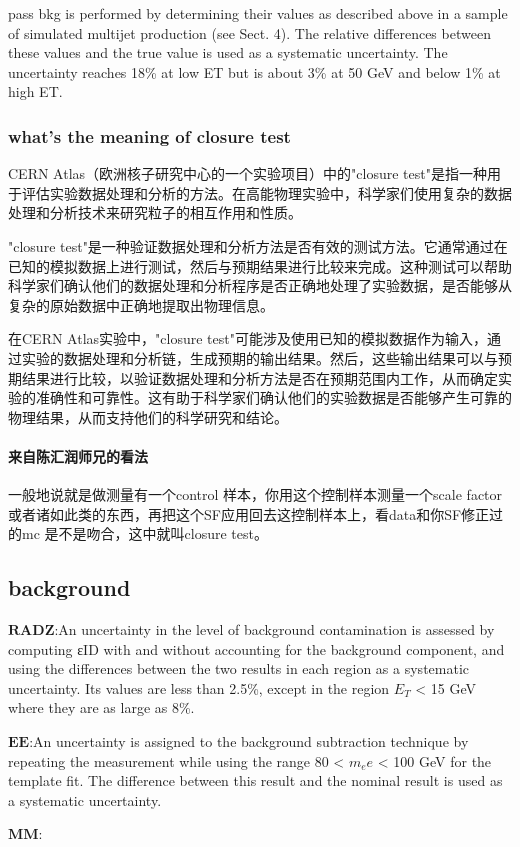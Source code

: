 \documentclass{ctexart}
\begin{document}
pass
bkg is performed by determining
their values as described above in a sample of simulated
multijet production (see Sect. 4). The relative differences
between these values and the true value is used as a systematic
uncertainty. The uncertainty reaches 18\% at low
ET but is about 3\% at 50 GeV and below 1\% at high ET.
\subsubsection{what's the meaning of closure test}
CERN Atlas（欧洲核子研究中心的一个实验项目）中的"closure test"是指一种用于评估实验数据处理和分析的方法。在高能物理实验中，科学家们使用复杂的数据处理和分析技术来研究粒子的相互作用和性质。

"closure test"是一种验证数据处理和分析方法是否有效的测试方法。它通常通过在已知的模拟数据上进行测试，然后与预期结果进行比较来完成。这种测试可以帮助科学家们确认他们的数据处理和分析程序是否正确地处理了实验数据，是否能够从复杂的原始数据中正确地提取出物理信息。

在CERN Atlas实验中，"closure test"可能涉及使用已知的模拟数据作为输入，通过实验的数据处理和分析链，生成预期的输出结果。然后，这些输出结果可以与预期结果进行比较，以验证数据处理和分析方法是否在预期范围内工作，从而确定实验的准确性和可靠性。这有助于科学家们确认他们的实验数据是否能够产生可靠的物理结果，从而支持他们的科学研究和结论。
\paragraph{来自陈汇润师兄的看法}
一般地说就是做测量有一个control 样本，你用这个控制样本测量一个scale factor或者诸如此类的东西，再把这个SF应用回去这控制样本上，看data和你SF修正过的mc 是不是吻合，这中就叫closure test。
\subsection{background}
$\mathbf{RADZ}$:An uncertainty in the level of background contamination
is assessed by computing εID with and without accounting
for the background component, and using the differences
between the two results in each region as a systematic
uncertainty. Its values are less than 2.5\%, except in
the region $E_T$ < 15 GeV where they are as large as 8\%.
\par$\mathbf{EE}$:An uncertainty is assigned to the background subtraction
technique by repeating the measurement while using the
range 80 < $m_ee$ < 100 GeV for the template fit. The
difference between this result and the nominal result is
used as a systematic uncertainty.
\par$\mathbf{MM}$:
\end{document}
